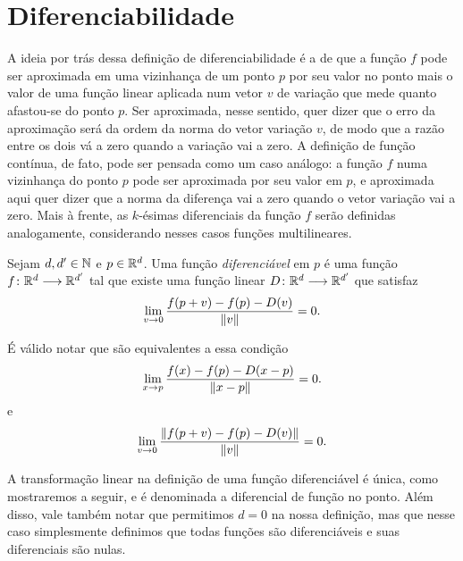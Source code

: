 \section{Diferenciabilidade}

A ideia por trás dessa definição de diferenciabilidade é a de que a função $f$ pode ser aproximada em uma vizinhança de um ponto $p$ por seu valor no ponto mais o valor de uma função linear aplicada num vetor $v$ de variação que mede quanto afastou-se do ponto $p$. Ser aproximada, nesse sentido, quer dizer que o erro da aproximação será da ordem da norma do vetor variação $v$, de modo que a razão entre os dois vá a zero quando a variação vai a zero. A definição de função contínua, de fato, pode ser pensada como um caso análogo: a função $f$ numa vizinhança do ponto $p$ pode ser aproximada por seu valor em $p$, e aproximada aqui quer dizer que a norma da diferença vai a zero quando o vetor variação vai a zero. Mais à frente, as $k$-ésimas diferenciais da função $f$ serão definidas analogamente, considerando nesses casos funções multilineares.

\begin{definition}
Sejam $d,d' \in \mathbb{N}$ e $p \in \mathbb{R}^d$. Uma função \emph{diferenciável} em $p$ é uma função ${f}\colon {\mathbb{R}^d} \longrightarrow {\mathbb{R}^{d'}}$ tal que existe uma função linear ${D}\colon {\mathbb{R}^d} \longrightarrow {\mathbb{R}^{d'}}$ que satisfaz
	\begin{equation*}
	\lim_{v \rightarrow 0} \frac{f(p+v)-f(p)-D(v)}{\left\Vert{v}\right\Vert} = 0.
	\end{equation*}
\end{definition}

É válido notar que são equivalentes a essa condição
	\begin{equation*}
	\lim_{x \rightarrow p} \frac{f(x)-f(p)-D(x-p)}{\left\Vert{x-p}\right\Vert} = 0.
	\end{equation*}
e
	\begin{equation*}
	\lim_{v \rightarrow 0} \frac{\left\Vert{f(p+v)-f(p)-D(v)}\right\Vert}{\left\Vert{v}\right\Vert} = 0.
	\end{equation*}

A transformação linear na definição de uma função diferenciável é única, como mostraremos a seguir, e é denominada a diferencial de função no ponto. Além disso, vale também notar que permitimos $d=0$ na nossa definição, mas que nesse caso simplesmente definimos que todas funções são diferenciáveis e suas diferenciais são nulas.

